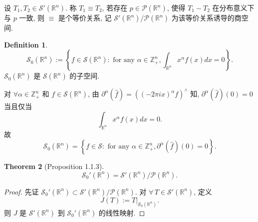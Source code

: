 \documentclass[a4paper,11pt]{article}
\newtheorem{theorem}{Theorem}[section]
\theoremstyle{definition}
\newtheorem{definition}[theorem]{Definition}
\begin{document}
\begin{CJK*}{UTF8}{gbsn}
设 $ T_1, T_2 \in \mathcal{S}'(\mathbb{R}^n) $. 称 $ T_1 \equiv T_2 $, 
若存在 $ p \in \mathcal{P}(\mathbb{R}^n) $, 使得 $ T_1 - T_2 $ 在分布意义下与 $ p $ 一致,
则 $ \equiv $ 是个等价关系, 记 $ \mathcal{S}'(\mathbb{R}^n)/ \mathcal{P}(\mathbb{R}^n) $ 为该等价关系诱导的商空间.


\begin{definition}
    $$
        \mathcal{S}_0(\mathbb{R}^n) 
            := \left\{ f \in \mathcal{S}(\mathbb{R}^n) :
                 \text{ for any } \alpha \in \mathbb{Z}_+^n, \int_{\mathbb{R}^n} x^\alpha f(x) dx = 0 \right\}.
    $$
    $ \mathcal{S}_0(\mathbb{R}^n) $ 是 $ \mathcal{S}(\mathbb{R}^n) $ 的子空间.
\end{definition} 



对 $ \forall \alpha \in \mathbb{Z}_+^n $ 和 $ f \in \mathcal{S}(\mathbb{R}^n) $,
由 $ \partial^\alpha (\hat{f}) = ((-2 \pi i x)^\alpha f)^\wedge $ 知, 
$ \partial^\alpha (\hat{f}) (0) = 0 $ 当且仅当
$$
    \int_{\mathbb{R}^n} x^\alpha f(x) dx = 0.
$$
故
$$
    \mathcal{S}_0(\mathbb{R}^n) 
        = \left\{ f \in \mathcal{S} :
             \text{ for any } \alpha \in \mathbb{Z}_+^n, \partial^\alpha (\hat{f}) (0) = 0 \right\}.
$$

\begin{theorem}[Proposition 1.1.3]
    $$
        \mathcal{S}_0'(\mathbb{R}^n) = \mathcal{S}'(\mathbb{R}^n) / \mathcal{P}(\mathbb{R}^n).
    $$
\end{theorem}

\begin{proof}
    先证 $ \mathcal{S}_0'(\mathbb{R}^n) \subset \mathcal{S}'(\mathbb{R}^n) / \mathcal{P}(\mathbb{R}^n) $. 
    对 $ \forall \, T \in \mathcal{S}'(\mathbb{R}^n) $, 定义
    $$
        J(T) := T \big|_{\mathcal{S}_0(\mathbb{R}^n)}.
    $$
    则 $ J $ 是 $ \mathcal{S}'(\mathbb{R}^n) $ 到 $ \mathcal{S}_0'(\mathbb{R}^n) $ 的线性映射. 
    

\end{proof}
\end{CJK*}
\end{document}

